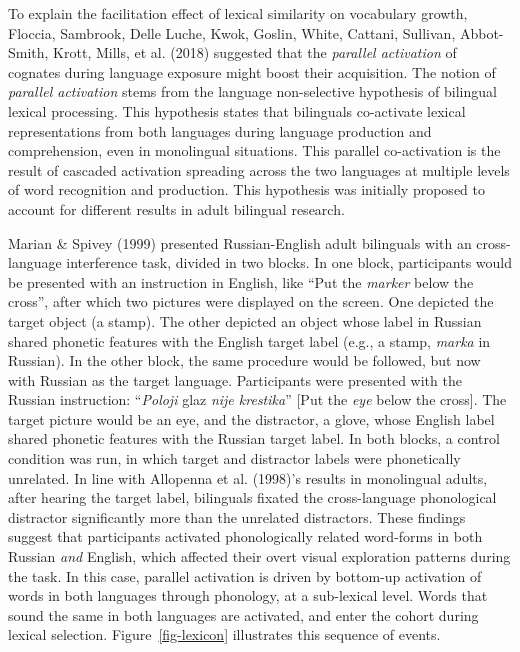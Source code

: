 \documentclass[
  12pt,
  b5paperpaper,
  twoside]{scrreprt}
\begin{document}
To explain the facilitation effect of lexical similarity on vocabulary
growth, Floccia, Sambrook, Delle Luche, Kwok, Goslin, White, Cattani,
Sullivan, Abbot-Smith, Krott, Mills, et al. (2018) suggested that the
\emph{parallel activation} of cognates during language exposure might
boost their acquisition. The notion of \emph{parallel activation} stems
from the language non-selective hypothesis of bilingual lexical
processing. This hypothesis states that bilinguals co-activate lexical
representations from both languages during language production and
comprehension, even in monolingual situations. This parallel
co-activation is the result of cascaded activation spreading across the
two languages at multiple levels of word recognition and production.
This hypothesis was initially proposed to account for different results
in adult bilingual research.

Marian \& Spivey (1999) presented Russian-English adult bilinguals with
an cross-language interference task, divided in two blocks. In one
block, participants would be presented with an instruction in English,
like ``Put the \emph{marker} below the cross'', after which two pictures
were displayed on the screen. One depicted the target object (a stamp).
The other depicted an object whose label in Russian shared phonetic
features with the English target label (e.g., a stamp, \emph{marka} in
Russian). In the other block, the same procedure would be followed, but
now with Russian as the target language. Participants were presented
with the Russian instruction: ``\emph{Poloji} glaz \emph{nije
krestika}'' {[}Put the \emph{eye} below the cross{]}. The target picture
would be an eye, and the distractor, a glove, whose English label shared
phonetic features with the Russian target label. In both blocks, a
control condition was run, in which target and distractor labels were
phonetically unrelated. In line with Allopenna et al. (1998)'s results
in monolingual adults, after hearing the target label, bilinguals
fixated the cross-language phonological distractor significantly more
than the unrelated distractors. These findings suggest that participants
activated phonologically related word-forms in both Russian \emph{and}
English, which affected their overt visual exploration patterns during
the task. In this case, parallel activation is driven by bottom-up
activation of words in both languages through phonology, at a
sub-lexical level. Words that sound the same in both languages are
activated, and enter the cohort during lexical selection.
Figure~\ref{fig-lexicon} illustrates this sequence of events.
\end{document}
